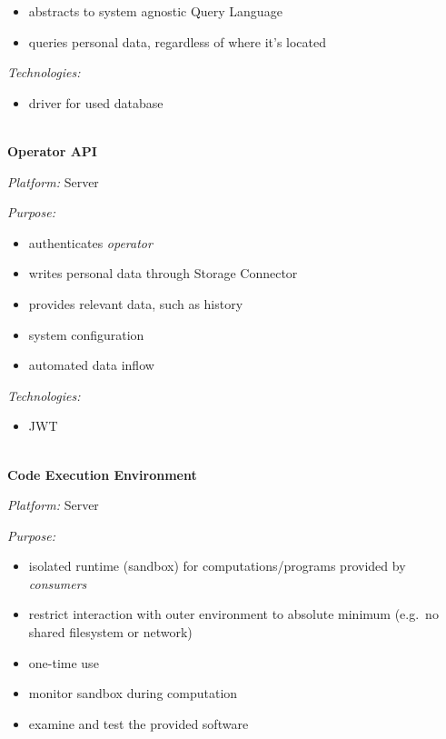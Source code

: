 \documentclass[12pt,english,a4paper,titlepage,cleardoublepage=empty,dottedtoc]{report}
\providecommand{\tightlist}{%
  \setlength{\itemsep}{0pt}\setlength{\parskip}{0pt}}
\begin{document}
\begin{itemize}
\tightlist
\item
  abstracts to system agnostic Query Language
\item
  queries personal data, regardless of where it's located
\end{itemize}

\emph{Technologies:}

\begin{itemize}
\tightlist
\item
  driver for used database
\end{itemize}

~\\
\textbf{Operator API}

\emph{Platform:} Server

\emph{Purpose:}

\begin{itemize}
\tightlist
\item
  authenticates \emph{operator}
\item
  writes personal data through Storage Connector
\item
  provides relevant data, such as history
\item
  system configuration
\item
  automated data inflow
\end{itemize}

\emph{Technologies:}

\begin{itemize}
\tightlist
\item
  JWT
\end{itemize}

~\\
\textbf{Code Execution Environment}

\emph{Platform:} Server

\emph{Purpose:}

\begin{itemize}
\tightlist
\item
  isolated runtime (sandbox) for computations/programs provided by
  \emph{consumers}
\item
  restrict interaction with outer environment to absolute minimum
  (e.g.~no shared filesystem or network)
\item
  one-time use
\item
  monitor sandbox during computation
\item
  examine and test the provided software
\end{itemize}
\end{document}
